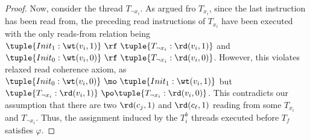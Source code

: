\begin{proof}
    Now, consider the thread $T_{\neg x_i}$. As argued fro $T_{x_i}$, since the last instruction has been read from, the preceding read instructions of $T_{x_i}$ have been executed with the only reads-from relation being 
    $\tuple{Init_1: \wt(v_i, 1)}~\rf~\tuple{T_{\neg x_i}: \rd(v_i, 1)}$ and $\tuple{Init_0: \wt(v_i, 0)}~\rf~\tuple{T_{\neg x_i}: \rd(v_i, 0)}$. 
    However, this violates relaxed read coherence axiom, as $\tuple{Init_0: \wt(v_i, 0)} ~\mo~\tuple{Init_1: \wt(v_i, 1)}$ but $\tuple{T_{\neg x_i}: \rd(v_i, 1)}~\po~\\ \tuple{T_{\neg x_i}: \rd(v_i, 0)}$. 
    This contradicts our assumption that there are two $\rd(c_j, 1)$ and $\rd(c_\ell, 1)$ reading from some $T_{x_i}$ and $T_{\neg x_i}$. 
    Thus, the assignment induced by the $T_i^b$ threads executed before $T_f$ satisfies $\varphi$.
\end{proof}

